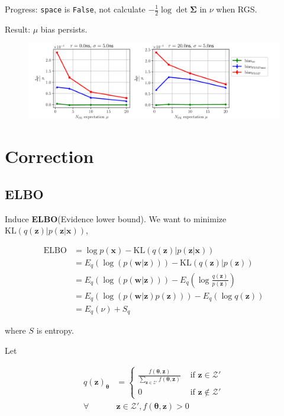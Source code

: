 \documentclass[notitlepage]{article}
\begin{document}
Progress: \texttt{space} is \texttt{False}, not calculate $-\frac{1}{2}\log\det\bm{\Sigma}$ in $\nu$ when RGS. 

Result: $\mu$ bias persists. 

\begin{figure}[H]
    \includegraphics[width=\textwidth]{vs-biasmu-nospaceprior.png}
\end{figure}

\section{Correction}

\subsection{ELBO}

Induce \textbf{ELBO}(Evidence lower bound). We want to minimize $\mathrm{KL}(q(\bm{z})|p(\bm{z}|\bm{x}))$, 

\begin{align}
    \mathrm{ELBO} &= \log p(\bm{x}) - \mathrm{KL}(q(\bm{z})|p(\bm{z}|\bm{x})) \\
    &= E_q(\log(p(\bm{w}|\bm{z}))) - \mathrm{KL}(q(\bm{z})|p(\bm{z})) \\
    &= E_q(\log(p(\bm{w}|\bm{z}))) - E_q(\log\frac{q(\bm{z})}{p(\bm{z})}) \\
    &= E_q(\log(p(\bm{w}|\bm{z})p(\bm{z}))) - E_q(\log q(\bm{z})) \\
    &= E_q(\nu) + S_q
\end{align}

where $S$ is entropy. 

Let

\begin{align}
    q(\bm{z})_{\bm{\theta}} &= \begin{cases}
        \frac{f(\bm{\theta},\bm{z})}{\sum_{\bm{z}\in\mathcal{Z}'}f(\bm{\theta},\bm{z})} & \text{ if } \bm{z} \in \mathcal{Z}' \\ 
        0 & \text{ if } \bm{z} \notin \mathcal{Z}'
    \end{cases} \\
    \forall &\bm{z}\in\mathcal{Z}', f(\bm{\theta},\bm{z}) > 0
\end{align}
\end{document}
